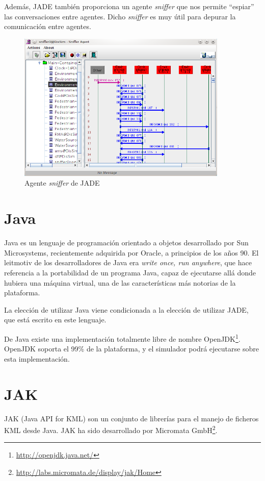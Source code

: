 Además, JADE también proporciona un agente {\em sniffer} que nos permite
``espiar'' las conversaciones entre agentes. Dicho {\em sniffer} es muy útil
para depurar la comunicación entre agentes.

\begin{figure}[H]
 \centering
 \includegraphics[width=100mm]{figuras/cap4/sniffer.png}
 \caption{Agente {\em sniffer} de JADE}
\end{figure}

\section{Java}

Java es un lenguaje de programación orientado a objetos desarrollado por Sun
Microsystems, recientemente adquirida por Oracle, a principios de los años 90.
El leitmotiv de los desarrolladores de Java era {\em write once, run anywhere},
que hace referencia a la portabilidad de un programa Java, capaz de ejecutarse
allá donde hubiera una máquina virtual, una de las características más notorias
de la plataforma.

La elección de utilizar Java viene condicionada a la elección de utilizar JADE,
que está escrito en este lenguaje.

De Java existe una implementación totalmente libre de nombre
OpenJDK\footnote{\url{http://openjdk.java.net/}}. OpenJDK soporta el 99\% de la
plataforma, y el simulador podrá ejecutarse sobre esta implementación.

\section{JAK}

JAK (Java API for KML) son un conjunto de librerías para el manejo de ficheros
KML desde Java. JAK ha sido desarrollado por Micromata
GmbH\footnote{\url{http://labs.micromata.de/display/jak/Home}}.

